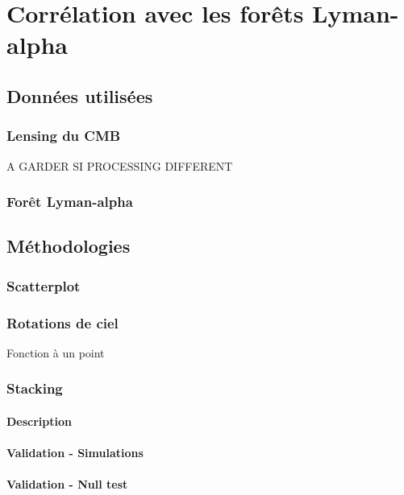 
\chapter{Corrélation avec les forêts Lyman-alpha} %

\label{Chapter7} %


\section{Données utilisées}
\subsection{Lensing du CMB}
A GARDER SI PROCESSING DIFFERENT
\subsection{Forêt Lyman-alpha}

\section{Méthodologies}

\subsection{Scatterplot}
\subsection{Rotations de ciel}
Fonction à un point
\subsection{Stacking}
\subsubsection{Description}
\subsubsection{Validation - Simulations}
\subsubsection{Validation - Null test}

